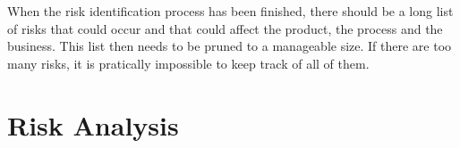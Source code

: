 When the risk identification process has been finished, there should be a long list of risks that could occur and that could affect the product, the process and the business. This list then needs to be pruned to a manageable size. If there are too many risks, it is pratically impossible to keep track of all of them.

\section{Risk Analysis}